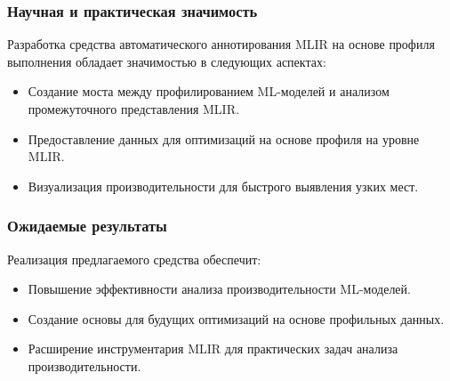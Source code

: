 \subsubsection{Научная и практическая значимость}
Разработка средства автоматического аннотирования MLIR на основе профиля выполнения обладает значимостью в следующих аспектах:
\begin{itemize}
\item Создание моста между профилированием ML-моделей и анализом промежуточного представления MLIR.
\item Предоставление данных для оптимизаций на основе профиля на уровне MLIR.
\item Визуализация производительности для быстрого выявления узких мест.
\end{itemize}

\subsubsection{Ожидаемые результаты}
Реализация предлагаемого средства обеспечит:
\begin{itemize}
\item Повышение эффективности анализа производительности ML-моделей.
\item Создание основы для будущих оптимизаций на основе профильных данных.
\item Расширение инструментария MLIR для практических задач анализа производительности.
\end{itemize}

\newpage